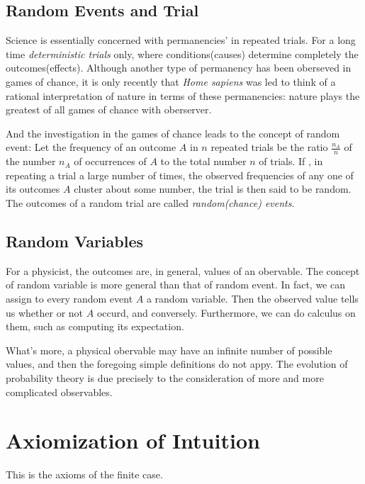 \documentclass[a4paper]{book}
\begin{document}
	\subsection{Random Events and Trial}

	Science is essentially concerned with  permanencies' in repeated trials.
	For a long time \textit{deterministic trials} only, where
	conditions(causes) determine completely the outcomes(effects). Although
	another type of permanency has been oberseved in games of chance, it is
	only recently that \textit{Home sapiens} was led to think of a rational
	interpretation of nature in terms of these permanencies: nature plays
	the greatest of all games of chance with
	oberserver.\cite{1977probability}

	And the investigation in the games of chance leads to the concept of
	random event: Let the frequency of an outcome $A$ in $n$ repeated
	trials be the ratio $\frac{n_A}{n}$ of the number $n_A$ of occurrences
	of $A$ to the total number $n$ of trials. If , in repeating a trial a
	large number of times, the observed frequencies of any one of its
	outcomes $A$ cluster about some number, the trial is then said to be
	random. The outcomes of a random trial are called \textit{random(chance)
	events}.\cite{1977probability}

	\subsection{Random Variables}

	For a physicist, the outcomes are, in general, values of an obervable.
	The concept of random variable is more general than that of random event.
	In fact, we can assign to every random event $A$ a random variable. Then
	the observed value tells us whether or not $A$ occurd, and conversely.
	Furthermore, we can do calculus on them, such as computing its
	expectation.\cite{1977probability}

	What's more, a physical obervable may have an infinite number of
	possible values, and then the foregoing simple definitions do not appy.
	The evolution of probability theory is due precisely to the
	consideration of more and more complicated
	observables.\cite{1977probability}

\section{Axiomization of Intuition}

	This is the axioms of the finite case.
\end{document}
